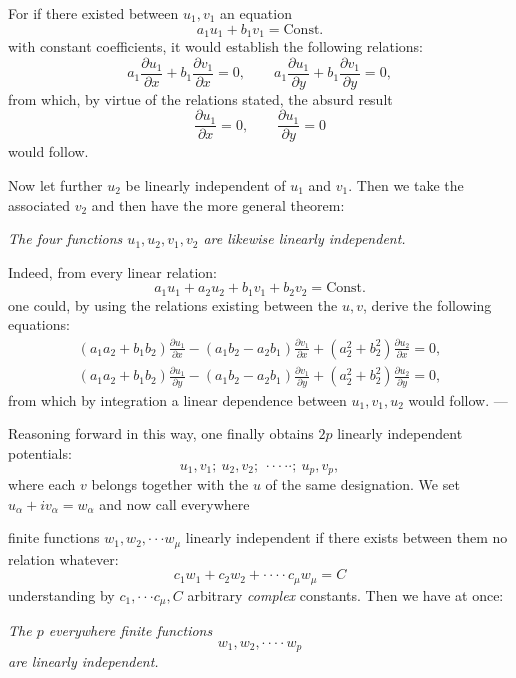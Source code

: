 \documentclass{article}
\begin{document}
For if there existed between $u_{1}, v_{1}$ an equation
\[ a_{1}u_{1} + b_{1}v_{1} = \text{Const.} \]
with constant coefficients, it would establish the following relations:
\[ a_{1}\frac{\partial u_{1}}{\partial x} + b_{1}\frac{\partial v_{1}}{\partial x} = 0, \qquad a_{1}\frac{\partial u_{1}}{\partial y} + b_{1}\frac{\partial v_{1}}{\partial y} = 0, \]
from which, by virtue of the relations stated, the absurd result
\[ \frac{\partial u_{1}}{\partial x} = 0, \qquad \frac{\partial u_{1}}{\partial y} = 0 \]
would follow.

Now let further $u_{2}$ be linearly independent of $u_{1}$ and $v_{1}$. Then we take the associated $v_{2}$ and then have the more general theorem:

\emph{The four functions $u_{1}, u_{2}, v_{1}, v_{2}$ are likewise linearly independent.}

Indeed, from every linear relation:
\[ a_{1}u_{1} + a_{2}u_{2} + b_{1}v_{1} + b_{2}v_{2} = \text{Const.} \]
one could, by using the relations existing between the $u, v$, derive the following equations:
\[ \begin{gathered} (a_{1}a_{2} + b_{1}b_{2})\frac{\partial u_{1}}{\partial x} - (a_{1}b_{2} - a_{2}b_{1})\frac{\partial v_{1}}{\partial x} + (a_{2}^{2} + b_{2}^{2})\frac{\partial u_{2}}{\partial x} = 0, \\ (a_{1}a_{2} + b_{1}b_{2})\frac{\partial u_{1}}{\partial y} - (a_{1}b_{2} - a_{2}b_{1})\frac{\partial v_{1}}{\partial y} + (a_{2}^{2} + b_{2}^{2})\frac{\partial u_{2}}{\partial y} = 0, \end{gathered} \]
from which by integration a linear dependence between $u_{1}, v_{1}, u_{2}$ would follow. ---

Reasoning forward in this way, one finally obtains $2p$ linearly independent potentials:
\[ u_{1}, v_{1};\ u_{2}, v_{2};\ \cdot\cdot\cdot\cdot\cdot;\ u_{p}, v_{p}, \]
where each $v$ belongs together with the $u$ of the same designation. We set $u_{\alpha} + iv_{\alpha} = w_{\alpha}$ and now call everywhere

finite functions $w_{1}, w_{2}, \cdot\cdot\cdot w_{\mu}$ linearly independent if there exists between them no relation whatever:
\[ c_{1}w_{1} + c_{2}w_{2} + \cdot\cdot\cdot\cdot c_{\mu}w_{\mu} = C \]
understanding by $c_{1}, \cdot\cdot\cdot c_{\mu}, C$ arbitrary \emph{complex} constants. Then we have at once:

\emph{The $p$ everywhere finite functions}
\[ w_{1}, w_{2}, \cdot\cdot\cdot\cdot w_{p} \]
\emph{are linearly independent.}
\end{document}
